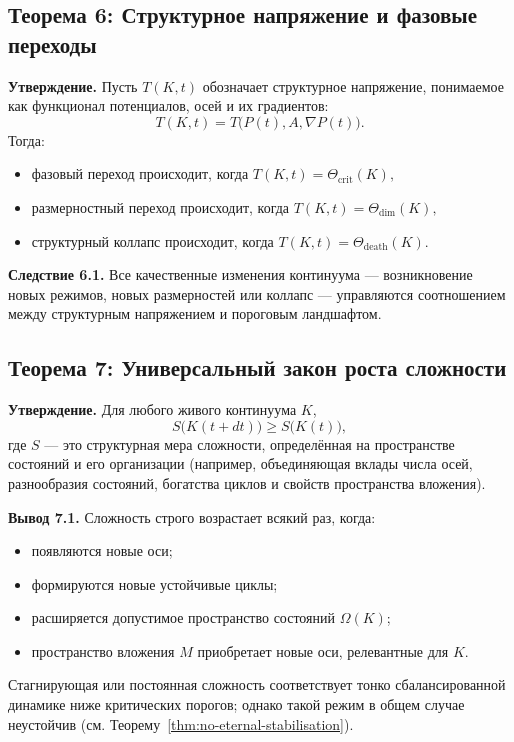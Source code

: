 \subsection{Теорема 6: Структурное напряжение и фазовые переходы}

\textbf{Утверждение.}
Пусть \(T(K,t)\) обозначает структурное напряжение, понимаемое как функционал потенциалов, осей и их градиентов:
\[
    T(K,t) = T\big(P(t),A,\nabla P(t)\big).
\]
Тогда:
\begin{itemize}
    \item фазовый переход происходит, когда
          \(
              T(K,t) = \Theta_{\mathrm{crit}}(K),
          \)
    \item размерностный переход происходит, когда
          \(
              T(K,t) = \Theta_{\mathrm{dim}}(K),
          \)
    \item структурный коллапс происходит, когда
          \(
              T(K,t) = \Theta_{\mathrm{death}}(K).
          \)
\end{itemize}

\textbf{Следствие 6.1.}
Все качественные изменения континуума --- возникновение новых режимов, новых размерностей или коллапс --- управляются соотношением между структурным напряжением и пороговым ландшафтом.

\subsection{Теорема 7: Универсальный закон роста сложности}

\textbf{Утверждение.}
Для любого живого континуума \(K\),
\[
    S\big(K(t+dt)\big) \ge S\big(K(t)\big),
\]
где \(S\) --- это структурная мера сложности, определённая на пространстве состояний и его организации (например, объединяющая вклады числа осей, разнообразия состояний, богатства циклов и свойств пространства вложения).

\textbf{Вывод 7.1.}
Сложность строго возрастает всякий раз, когда:
\begin{itemize}
    \item появляются новые оси;
    \item формируются новые устойчивые циклы;
    \item расширяется допустимое пространство состояний \(\Omega(K)\);
    \item пространство вложения \(M\) приобретает новые оси, релевантные для \(K\).
\end{itemize}
Стагнирующая или постоянная сложность соответствует тонко сбалансированной динамике ниже критических порогов; однако такой режим в общем случае неустойчив (см. Теорему~\ref{thm:no-eternal-stabilisation}).

